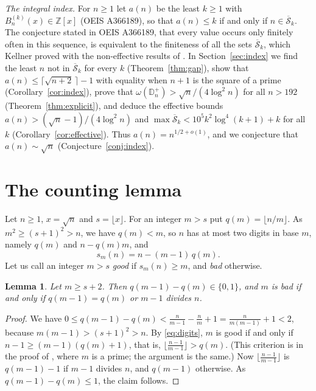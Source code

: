\documentclass[11pt]{amsart}
\newtheorem{lemma}[theorem]{Lemma}
\theoremstyle{remark}
\numberwithin{equation}{section}
\newcommand{\ZZ}{\mathbb Z}
\newcommand{\Dp}{\mathbb D^{+}}
\newcommand{\fl}[1]{\lfloor #1\rfloor}
\newcommand{\Sb}{\overline{\mathcal S}}
\begin{document}
\emph{The integral index.} For $n\ge1$ let $a(n)$ be the least $k\ge1$ with $B_n^{(k)}(x)\in\ZZ[x]$ (OEIS A366189), so that
$a(n)\le k$ if and only if $n\in\Sb_k$. The conjecture stated in OEIS A366189, that every value occurs only finitely often in
this sequence, is equivalent to the finiteness of all the sets $\Sb_k$, which Kellner proved \cite[Theorem 14]{K24} with the
non-effective results of \cite{BLMS}. In Section~\ref{sec:index} we find the least $n$ not in $\Sb_k$ for every $k$
(Theorem~\ref{thm:gap}), show that $a(n)\le\lceil\sqrt{n+2}\,\rceil-1$ with equality when $n+1$ is the square of a prime
(Corollary~\ref{cor:index}), prove that $\omega(\Dp_n)>\sqrt n/(4\log^2n)$ for all $n>192$ (Theorem~\ref{thm:explicit}), and deduce
the effective bounds $a(n)>(\sqrt n-1)/(4\log^2n)$ and $\max\Sb_k<10^5k^2\log^4(k+1)+k$ for all $k$ (Corollary~\ref{cor:effective}).
Thus $a(n)=n^{1/2+o(1)}$, and we conjecture that $a(n)\sim\sqrt n$ (Conjecture~\ref{conj:index}).

\section{The counting lemma}

Let $n\ge1$, $x=\sqrt n$ and $s=\fl x$. For an integer $m>s$ put $q(m)=\fl{n/m}$. As $m^2\ge(s+1)^2>n$, we have $q(m)<m$, so $n$ has
at most two digits in base $m$, namely $q(m)$ and $n-q(m)m$, and
\begin{equation}\label{eq:digits}
s_m(n)=n-(m-1)\,q(m).
\end{equation}
Let us call an integer $m>s$ \emph{good} if $s_m(n)\ge m$, and \emph{bad} otherwise.

\begin{lemma}\label{lem:one}
Let $m\ge s+2$. Then $q(m-1)-q(m)\in\{0,1\}$, and $m$ is bad if and only if $q(m-1)=q(m)$ or $m-1$ divides $n$.
\end{lemma}
\begin{proof}
We have $0\le q(m-1)-q(m)<\frac n{m-1}-\frac nm+1=\frac n{m(m-1)}+1<2$, because $m(m-1)>(s+1)^2>n$.
By \eqref{eq:digits}, $m$ is good if and only if $n-1\ge(m-1)(q(m)+1)$, that is, $\fl{\frac{n-1}{m-1}}>q(m)$. (This criterion is
\cite[(11)]{K17} in the proof of \cite[Lemma 6]{K17}, where $m$ is a prime; the argument is the same.) Now
$\fl{\frac{n-1}{m-1}}$ is $q(m-1)-1$ if $m-1$ divides $n$, and $q(m-1)$ otherwise. As $q(m-1)-q(m)\le1$, the claim follows.
\end{proof}
\end{document}
